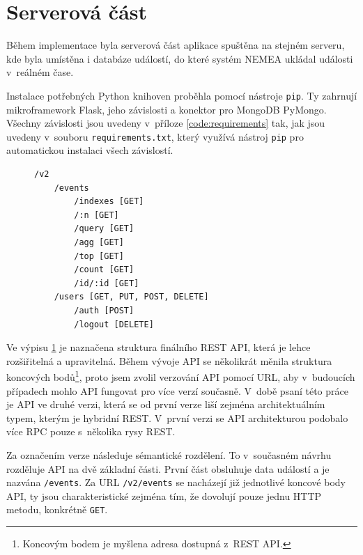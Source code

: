 \section{Serverová část}

Během implementace byla serverová část aplikace spuštěna na stejném serveru, kde byla umístěna i databáze událostí, do které systém NEMEA ukládal události v~reálném čase.

Instalace potřebných Python knihoven proběhla pomocí nástroje \texttt{pip}. Ty zahrnují  mikroframework Flask, jeho závislosti a konektor pro MongoDB PyMongo. Všechny závislosti jsou uvedeny v~příloze \ref{code:requirements} tak, jak jsou uvedeny v~souboru \texttt{requirements.txt}, který využívá nástroj \texttt{pip} pro automatickou instalaci všech závislostí.

\begin{figure}[ht]
\lstset{basicstyle=\small,style=JSON}
\begin{lstlisting}
/v2
    /events
        /indexes [GET]
        /:n [GET]
        /query [GET]
        /agg [GET]
        /top [GET]
        /count [GET]
        /id/:id [GET]
    /users [GET, PUT, POST, DELETE]
        /auth [POST]
        /logout [DELETE]
\end{lstlisting}
\label{code:api}
\end{figure}

Ve výpisu \ref{code:api} je naznačena struktura finálního REST API, která je lehce rozšiřitelná a upravitelná. Během vývoje API se několikrát měnila struktura koncových bodů\footnote{Koncovým bodem je myšlena adresa dostupná z~REST API.}, proto jsem zvolil verzování API pomocí URL, aby v~budoucích případech mohlo API fungovat pro více verzí současně. V~době psaní této práce je API ve druhé verzi, která se od první verze liší zejména architektuálním typem, kterým je hybridní REST. V~první verzi se API architekturou podobalo více RPC pouze s~několika rysy REST.

Za označením verze následuje sémantické rozdělení. To v~současném návrhu rozděluje API na dvě základní části. První část obsluhuje data událostí a je nazvána \texttt{/events}. Za URL \texttt{/v2/events} se nacházejí již jednotlivé koncové body API, ty jsou charakteristické zejména tím, že dovolují pouze jednu HTTP metodu, konkrétně \texttt{GET}.

